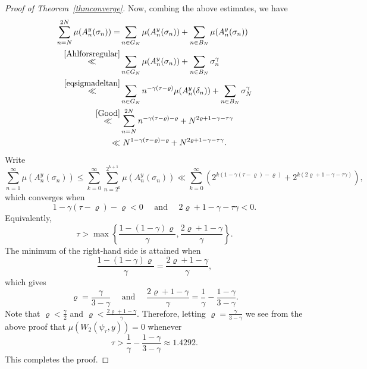 \documentclass[10pt,a4paper]{amsart}
\numberwithin{equation}{section} %
\begin{document}
\begin{proof}[Proof of Theorem~\ref{thmconverge}]
Now, combing the above estimates, we have 
\[
	\begin{aligned}
		\sum_{n = N}^{2N}\mu (A_{n}^{y}(\sigma_{n}))
		=&\sum_{n\in G_N}\mu (A_{n}^{y}(\sigma_{n}))+\sum_{n\in B_N}\mu (A_{n}^{y}(\sigma_{n})) \\
\stackrel{\eqref{Ahlforsregular}}{\ll}&\sum_{n\in G_N}\mu (A_{n}^{y}(\sigma_{n}))+\sum_{n\in B_N}\sigma_n^{\gamma}\\
\stackrel{\eqref{eqsigmadeltan}}{\ll} &\sum_{n\in G_N}n^{-\gamma(\tau-\varrho)}\mu (A_{n}^{y}(\delta_{n}))
		+ \sum_{n\in B_N}\sigma_{N}^{\gamma}\\
\stackrel{\eqref{Good}}{\ll} & \sum_{n = N}^{2N}n^{-\gamma(\tau-\varrho)-\varrho}
		+ N^{2\varrho+1-\gamma-\tau\gamma}\\
		\ll &\  N^{1-\gamma(\tau-\varrho)-  \varrho}+N^{2\varrho+1-\gamma-\tau\gamma}.
	\end{aligned}
	\]
	Write
	\[
	\sum_{n = 1}^{\infty}\mu (A_{n}^{y}(\sigma_{n}))
	\leqslant \sum_{k = 0}^{\infty}\sum_{n = 2^{k}}^{2^{k + 1}}\mu (A_{n}^{y}(\sigma_{n}))\ll\sum_{k = 0}^{\infty}(2^{k(1-\gamma(\tau-\varrho)- \varrho)}+2^{k(2\varrho+1-\gamma-\tau\gamma)}),
	\]
	which converges when
	\[1-\gamma(\tau-\varrho)-\varrho<0\quad \text{ and } \quad  2\varrho+1-\gamma-\tau\gamma<0.\]
	Equivalently,
	\[\tau>\max\left\{\frac{1-(1-\gamma)\varrho}{\gamma}, \frac{2\varrho+1-\gamma}{\gamma}\right\}.\]
The minimum of the right-hand side is attained when
	\[\frac{1-(1-\gamma)\varrho}{\gamma}=\frac{2\varrho+1-\gamma}{\gamma},\]
	which gives
	\[\varrho =\frac{\gamma}{3-\gamma} \quad \text{ and } \quad \frac{2\varrho+1-\gamma}{\gamma}=\frac{1}{\gamma}-\frac{1-\gamma}{3-\gamma}.\]
	Note that $\varrho<\frac{\gamma}{2}$ and 
$\varrho<\frac{2\varrho+1-\gamma}{\gamma}$. Therefore, letting $\varrho =\frac{\gamma}{3-\gamma}$ we see from the above proof that  $\mu(W_{2}(\psi_{\tau},y))=0$ whenever 
\[\tau>\frac{1}{\gamma}-\frac{1-\gamma}{3-\gamma}\approx 1.4292.\]
This completes the proof.
\end{proof}
\end{document}
